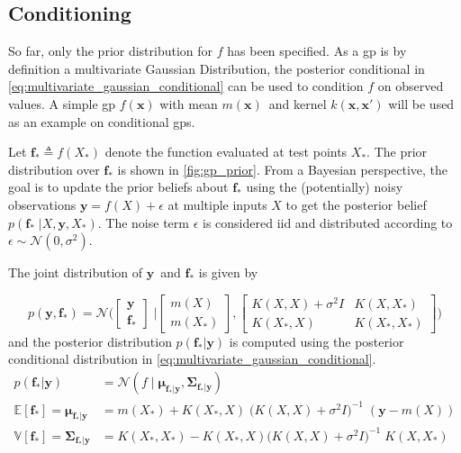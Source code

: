 \subsection{Conditioning}
So far, only the prior distribution for $f$ has been specified. As a \acrshort{gp} is by definition a multivariate Gaussian Distribution, the posterior conditional in \cref{eq:multivariate_gaussian_conditional} can be used to condition $f$ on observed values. A simple \acrshort{gp} $f(\boldsymbol{x})$ with mean $m(\boldsymbol{x})$ and kernel $k(\boldsymbol{x}, \boldsymbol{x}')$ will be used as an example on conditional \acrshort{gp}s.

Let $\boldsymbol{f}_* \triangleq f(X_*)$ denote the function evaluated at test points $X_*$. The prior distribution over $\boldsymbol{f_*}$ is shown in \cref{fig:gp_prior}. From a Bayesian perspective, the goal is to update the prior beliefs about $\boldsymbol{f}_*$ using the (potentially) noisy observations $\boldsymbol{y} = f(X) + \epsilon$ at multiple inputs $X$ to get the posterior belief $p(\boldsymbol{f}_* \; | X, \boldsymbol{y}, X_*)$. The noise term $\epsilon$ is considered \acrshort{iid} and distributed according to $\epsilon \sim \mathcal{N}(0, \sigma^2)$.

The joint distribution of $\boldsymbol{y}$ and $\boldsymbol{f}_*$ is given by 

\begin{equation}
    p(\boldsymbol{y}, \boldsymbol{f}_*) = \mathcal{N}\bigg(\begin{bmatrix}
        \boldsymbol{y} \\ \boldsymbol{f}_*
    \end{bmatrix} \; \bigg| \begin{bmatrix}
        m(X) \\ m(X_*)
    \end{bmatrix},  \begin{bmatrix}
        K(X, X) + \sigma^2 I & K(X, X_*) \\ K(X_*, X) & K(X_*, X_*)
    \end{bmatrix}\bigg)
\end{equation}
and the posterior distribution $p(\boldsymbol{f}_* | \boldsymbol{y})$ is computed using the posterior conditional distribution in \cref{eq:multivariate_gaussian_conditional}.
\begin{subequations}\label{eq:gp_conditional}
\begin{align}
    p(\boldsymbol{f}_* | \boldsymbol{y}) &= \mathcal{N}(f \; | \; \boldsymbol{\mu}_{\boldsymbol{f}_*|\boldsymbol{y}}, \boldsymbol{\Sigma}_{\boldsymbol{f}_*|\boldsymbol{y}})\\
    \mathbb{E}[\boldsymbol{f}_*] =  \boldsymbol{\mu}_{\boldsymbol{f}_* | \boldsymbol{y}} &= m(X_*) + K(X_*, X) \; \big(K(X, X) + \sigma^2 I\big)^{-1} \; (\boldsymbol{y} - m(X))\label{eq:gp_conditional_mean}\\
    \mathbb{V}[\boldsymbol{f}_*] = \boldsymbol{\Sigma}_{\boldsymbol{f}_* | \boldsymbol{y}} &= K(X_*, X_*) - K(X_*, X)  \big(K(X, X) + \sigma^2 I\big)^{-1} \; K(X, X_*)\label{eq:gp_conditional_var}
\end{align}
\end{subequations}


